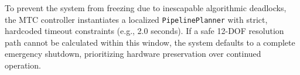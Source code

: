 To prevent the system from freezing due to inescapable algorithmic deadlocks, the MTC controller instantiates a localized \texttt{PipelinePlanner} with strict, hardcoded timeout constraints (e.g., 2.0 seconds). If a safe 12-DOF resolution path cannot be calculated within this window, the system defaults to a complete emergency shutdown, prioritizing hardware preservation over continued operation.